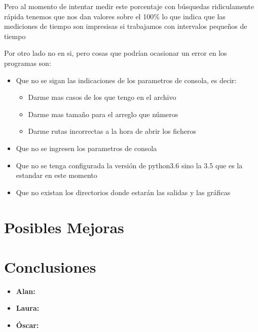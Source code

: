 \documentclass[12pt, fleqn]{article}                             %
\newcommand \Quote {\qq}                                        %
\theoremstyle{break}                                            %
\begin{document}
    Pero al momento de intentar medir este porcentaje con búsquedas ridiculamente
    rápida tenemos que nos dan valores sobre el 100\% lo que indica que las mediciones
    de tiempo son impresisas si trabajamos con intervalos pequeños de tiempo

    Por otro lado no \Quote{errores} en si, pero cosas que podrían ocasionar un error
    en los programas son:
    \begin{itemize}
        \item Que no se sigan las indicaciones de los parametros de consola, es decir:
        \begin{itemize}
            \item Darme mas casos de los que tengo en el archivo
            \item Darme mas tamaño para el arreglo que números
            \item Darme rutas incorrectas a la hora de abrir los ficheros
        \end{itemize}
        \item Que no se ingresen los parametros de consola
        \item Que no se tenga configurada la versión de python3.6 sino la 3.5 que es
        la estandar en este momento
        \item Que no existan los directorios donde estarán las salidas y las gráficas
    \end{itemize}



\clearpage
\section{Posibles Mejoras}



\clearpage
\section{Conclusiones}

\begin{itemize}\setlength\itemsep{0em}

    \item \textbf{Alan:} 
    
    
    \item \textbf{Laura:} 
    
    
    \item \textbf{Óscar:} 
\end{itemize}
\end{document}
